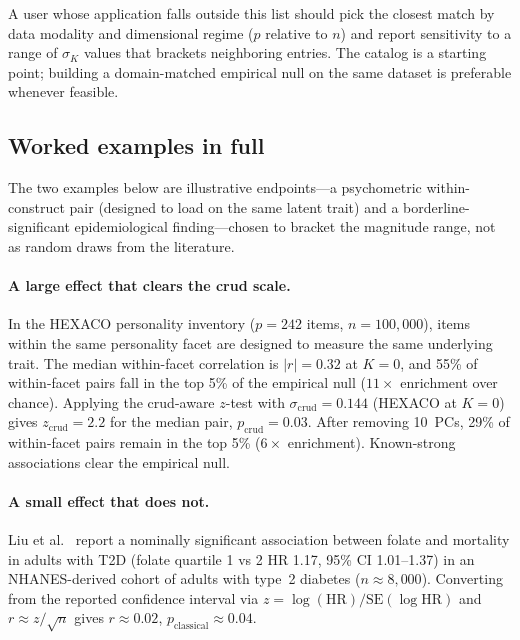 A user whose application falls outside this list should pick the closest match by data modality and dimensional regime ($p$ relative to $n$) and report sensitivity to a range of $\sigma_K$ values that brackets neighboring entries. The catalog is a starting point; building a domain-matched empirical null on the same dataset is preferable whenever feasible.

\subsection{Worked examples in full}
\label{si:worked-examples-extended}

The two examples below are illustrative endpoints---a psychometric within-construct pair (designed to load on the same latent trait) and a borderline-significant epidemiological finding---chosen to bracket the magnitude range, not as random draws from the literature.

\paragraph{A large effect that clears the crud scale.} In the HEXACO personality inventory ($p=242$ items, $n=100{,}000$), items within the same personality facet are designed to measure the same underlying trait. The median within-facet correlation is $|r|=0.32$ at $K=0$, and 55\% of within-facet pairs fall in the top 5\% of the empirical null ($11\times$ enrichment over chance). Applying the crud-aware $z$-test with $\sigma_{\mathrm{crud}} = 0.144$ (HEXACO at $K=0$) gives $z_{\mathrm{crud}} = 2.2$ for the median pair, $p_{\mathrm{crud}} = 0.03$. After removing 10~PCs, 29\% of within-facet pairs remain in the top 5\% ($6\times$ enrichment). Known-strong associations clear the empirical null.

\paragraph{A small effect that does not.} Liu et al.~\citep{liu2022} report a nominally significant association between folate and mortality in adults with T2D (folate quartile 1 vs 2 HR 1.17, 95\% CI 1.01--1.37) in an NHANES-derived cohort of adults with type~2 diabetes ($n \approx 8{,}000$). Converting from the reported confidence interval via $z = \log(\mathrm{HR})/\mathrm{SE}(\log\mathrm{HR})$ and $r \approx z/\sqrt{n}$ gives $r \approx 0.02$, $p_{\mathrm{classical}} \approx 0.04$.

